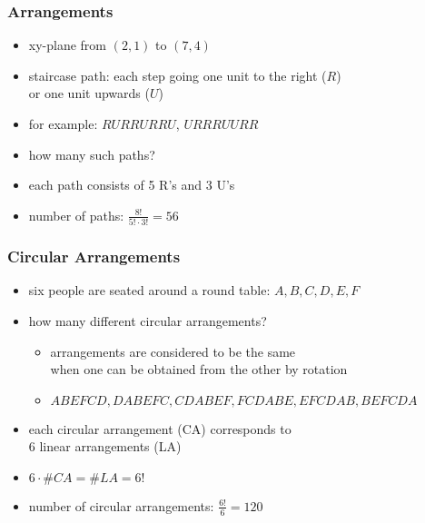 \documentclass[dvipsnames]{beamer}
\begin{document}
\begin{frame}
  \frametitle{Arrangements}

  \begin{example}
    \begin{itemize}
      \item xy-plane from $(2,1)$ to $(7,4)$
      \item staircase path: each step going one unit to the right ($R$)\\
        or one unit upwards ($U$)
      \item for example: $RURRURRU$, $URRRUURR$
      \item how many such paths?

      \pause
      \medskip
      \item each path consists of 5 R's and 3 U's
      \item number of paths: $\frac{8!}{5! \cdot 3!} = 56$
    \end{itemize}
  \end{example}
\end{frame}

\begin{frame}
  \frametitle{Circular Arrangements}

  \begin{example}
    \begin{itemize}
      \item six people are seated around a round table: $A,B,C,D,E,F$
      \item how many different circular arrangements?
      \begin{itemize}
        \item arrangements are considered to be the same\\
          when one can be obtained from the other by rotation
        \item $ABEFCD, DABEFC, CDABEF, FCDABE, EFCDAB, BEFCDA$
      \end{itemize}

      \pause
      \medskip
      \item each circular arrangement (CA) corresponds to\\
        6 linear arrangements (LA)
      \item $6 \cdot \#CA = \#LA = 6!$
      \item number of circular arrangements: $\frac{6!}{6} = 120$
    \end{itemize}
  \end{example}
\end{frame}
\end{document}
